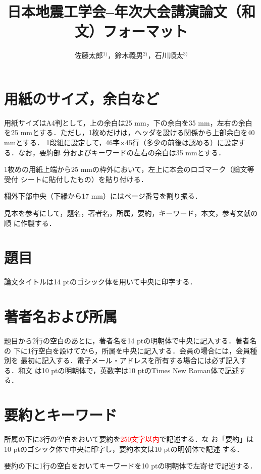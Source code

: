 \documentclass{jaee}
\title{日本地震工学会--年次大会講演論文（和文）フォーマット}
\author{佐藤太郎$^{1)}$，鈴木義男$^{2)}$，石川順太$^{3)}$}
\begin{document}
\maketitle

\renewcommand{\thefootnote}{\arabic{footnote}}

\section{用紙のサイズ，余白など}
\label{sec:1}

用紙サイズはA4判として，上の余白は25 mm，下の余白を35 mm，左右の余白を25
mmとする．ただし，1枚めだけは，ヘッダを設ける関係から上部余白を40 mmとする．
1段組に設定して，46字×45行（多少の前後は認める）に設定する．なお，要約部
分およびキーワードの左右の余白は35 mmとする．

1枚めの用紙上端から25 mmの枠外において，左上に本会のロゴマーク（論文等受付
シートに貼付したもの）を貼り付ける．

欄外下部中央（下縁から17 mm）にはページ番号を割り振る．

見本を参考にして，題名，著者名，所属，要約，キーワード，本文，参考文献の順
に作製する．

\section{題目}
\label{sec:2}

論文タイトルは14 ptのゴシック体を用いて中央に印字する．

\section{著者名および所属}
\label{sec:3}

題目から2行の空白のあとに，著者名を14 ptの明朝体で中央に記入する．著者名の
下に1行空白を設けてから，所属を中央に記入する．会員の場合には，会員種別を
最初に記入する．電子メール・アドレスを所有する場合には必ず記入する．和文
は10 ptの明朝体で，英数字は10 ptのTimes New Roman体で記述する．

\section{要約とキーワード}
\label{sec:4}

所属の下に3行の空白をおいて要約を\textcolor{red}{250文字以内}で記述する．な
お「要約」は10 ptのゴシック体で中央に印字し，要約本文は10 ptの明朝体で記述
する．

要約の下に1行の空白をおいてキーワードを10 ptの明朝体で左寄せで記述する．
\end{document}
